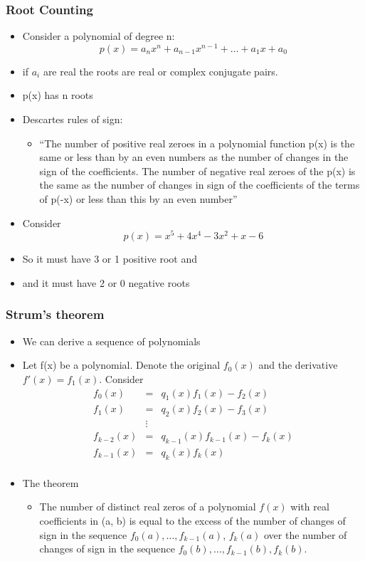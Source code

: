 \documentclass[10pt]{beamer}
\begin{document}
\begin{frame}
  \frametitle{Root Counting}
  \begin{itemize}
  \item Consider a polynomial of degree n:
    \[
      p(x) = a_n x^n + a_{n-1} x^{n-1} + \ldots + a_1 x + a_0
    \]
  \item if $a_i$ are real the roots are real or complex conjugate pairs. 
  \item p(x) has n roots
  \item Descartes rules of sign:
    \begin{itemize}
    \item ``The number of positive real zeroes in a polynomial
      function p(x) is the same or less than by an even numbers as the
      number of changes in the sign of the coefficients. The number of
      negative real zeroes of the p(x) is the same as the number of
      changes in sign of the coefficients of the terms of p(-x) or
      less than this by an even number''
    \end{itemize}
  \item Consider
    \[
      p(x) = x^5 + 4 x^4 - 3 x^2 + x -6
    \]
  \item So it must have 3 or 1 positive root and
  \item and it must have 2 or 0 negative roots
  \end{itemize}
\end{frame}

\begin{frame}
  \frametitle{Strum's theorem}
  \begin{itemize}
  \item We can derive a sequence of polynomials
  \item Let f(x) be a polynomial. Denote the original $f_0(x)$ and the
    derivative $f'(x) = f_1(x)$. Consider
    \[
      \begin{array}{rcl}
        f_0(x)      &=& q_1(x) f_1(x) - f_2(x) \\
        f_1(x)      &=& q_2(x) f_2(x) - f_3(x) \\
                 &\vdots& \\
        f_{k-2}(x) &=& q_{k-1}(x) f_{k-1}(x) - f_k(x) \\
        f_{k-1}(x) &=& q_k(x) f_k(x) \\
      \end{array}
    \]
  \item The theorem
    \begin{itemize}
    \item The number of distinct real zeros of a polynomial $f(x)$
      with real coefficients in (a, b) is equal to the excess of the
      number of changes of sign in the sequence $f_0(a), \ldots ,
      f_{k−1}(a)$, $f_k(a)$ over the number of changes of sign in the
      sequence $f_0(b), \ldots , f_{k−1}(b), f_k(b)$.
    \end{itemize}
  \end{itemize}
\end{frame}
\end{document}
